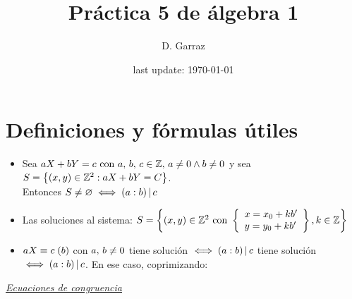 \documentclass[12pt,a4paper, spanish]{article}
\begin{document}
\pagestyle{empty} %

\title{Práctica 5 de álgebra 1} %
\author{D. Garraz} %
\date{last update: \today} %

\maketitle  %

\section{Definiciones y fórmulas útiles}

\def\mcd{(a:b)}

\begin{itemize}
	\item Sea $aX + bY = c \text{ con } a,\, b,\, c \en \enteros,\, a \distinto 0 \y b \distinto 0$ y sea
	      $S = \set{ (x,y) \en \enteros^2 : aX + bY = C }$.\\
	      Entonces $S \distinto \vacio \sisolosi (a:b) \divide c$

	\item Las soluciones al sistema: $S = \set{(x,y) \en \enteros^2 \text{ con }
			      \llaves{l}{
				      x = x_0 + kb'\\
				      y = y_0 + kb'
			      }
			      , k \en \enteros}
	      $

	\item $\congruencia{aX}{c}{b}$ con $ a,\, b \distinto 0$ tiene solución $\sisolosi \mcd \divide c$ tiene solución $\sisolosi \mcd \divide c$. En ese caso, coprimizando:
\end{itemize}

\textit\underline{Ecuaciones de congruencia}
\end{document}
